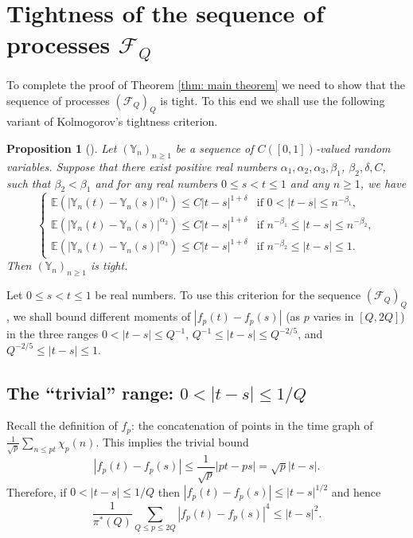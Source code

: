 \documentclass[10pt]{amsart}
\theoremstyle{plain}
\newtheorem{pro}[thm]{Proposition}
\theoremstyle{definition}
\newcommand{\Y}{\mathbb{Y}}
\newcommand{\ex}{\mathbb{E}}
\begin{document}
\section{Tightness of the sequence of processes \texorpdfstring{$\mathcal{F}_Q$}{FQ}}\label{s: Tighness}

To complete the proof of Theorem \ref{thm: main theorem} we need to show that the sequence of processes $(\mathcal{F}_{Q})_Q$ is tight. To this end we shall use the following variant of Kolmogorov's tightness criterion.

\begin{pro}[{\cite[Prop.\,B.11.11]{Ko}}] Let $(\Y_n)_{n\geq 1}$ be a sequence of $C([0,1])$-valued random variables. Suppose that there exist positive real numbers $\alpha_1, \alpha_2, \alpha_3, \beta_1$, $\beta_2, \delta, C$, such that $\beta_2<\beta_1$ and
for any real numbers $0\leq s<t\leq 1$ and any $n\geq 1$, we have
\[
\begin{cases}
\ex(|\Y_n(t)-\Y_n(s)|^{\alpha_1})\leq C|t-s|^{1+\delta} & \text{if } 0< |t-s|\leq n^{-\beta_1}, \\
\ex(|\Y_n(t)-\Y_n(s)|^{\alpha_2})\leq C|t-s|^{1+\delta} & \text{if } n^{-\beta_1}\leq |t-s|\leq n^{-\beta_2}, \\
\ex(|\Y_n(t)-\Y_n(s)|^{\alpha_3})\leq C|t-s|^{1+\delta} & \text{if } n^{-\beta_2}\leq |t-s|\leq 1.
\end{cases}
\]
Then $(\Y_n)_{n\geq 1}$ is tight.
\end{pro}

Let $0\leq s<t\leq 1$ be real numbers. To use this criterion for the sequence $(\mathcal{F}_{Q})_Q$, we shall bound different moments of $|f_p(t)-f_p(s)|$ (as $p$ varies in $[Q, 2Q]$) in the three ranges $0< |t-s|\leq Q^{-1}$, $Q^{-1}\leq |t-s|\leq Q^{-2/5}$, and $ Q^{-2/5}\leq |t-s|\leq 1.$

\subsection{The ``trivial'' range: $0< |t-s|\leq 1/Q$}
Recall the definition of $f_p$: the concatenation of points in the time graph of $\frac{1}{\sqrt{p}} \sum_{n \leq pt} \chi_p(n)$. This implies the trivial bound
\[
|f_p(t) - f_p(s)| \leq \frac{1}{\sqrt{p}}|pt - ps| = \sqrt{p}|t-s|.
\]
Therefore, if $0<|t-s|\leq 1/Q$ then $|f_p(t) - f_p(s)|\leq |t-s|^{1/2}$ and hence
\begin{equation}\label{FirstRangeTS}
\frac{1}{\pi^*(Q)}\sum_{Q\leq p\leq 2Q}
|f_p(t)-f_p(s)|^4 \leq |t-s|^2.
\end{equation}
\end{document}
